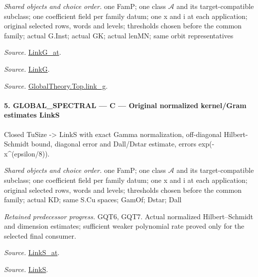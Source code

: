 \documentclass[11pt,a4paper]{article}
\numberwithin{equation}{section}
\theoremstyle{remark}\newtheorem{remark}[theorem]{Remark}
\begin{document}
\emph{Shared objects and choice order.} one FamP; one class $\mathcal A$ and its target-compatible subclass; one coefficient field per family datum; one x and i at each application; original selected rows, words and levels; thresholds chosen before the common family; actual G.Inst; actual GK; actual lenMN; same orbit representatives

\emph{Source.} \href{https://github.com/CocoSgt/riemann-hypothesis-lean/blob/7cbf7a0c32fca1badf05931879a37c3f8a2b03b4/src/Formalism/SharpRestriction/GlobalTheoremInputs.lean#L122-L137}{LinkG\_\allowbreak at}.

\emph{Source.} \href{https://github.com/CocoSgt/riemann-hypothesis-lean/blob/7cbf7a0c32fca1badf05931879a37c3f8a2b03b4/src/Formalism/SharpRestriction/GlobalTheoremInputs.lean#L138-L141}{LinkG}.

\emph{Source.} \href{https://github.com/CocoSgt/riemann-hypothesis-lean/blob/7cbf7a0c32fca1badf05931879a37c3f8a2b03b4/src/Development/AbelianVarietyTheory/Proofs/GlobalInterpolation/LinkG.lean#L14-L27}{GlobalTheory.Top.link\_\allowbreak g}.



\paragraph{5. GLOBAL\_\allowbreak SPECTRAL — C — Original normalized kernel/Gram estimates LinkS}

Closed TuSize -> LinkS with exact Gamma normalization, off-diagonal Hilbert-Schmidt bound, diagonal error and Dall/Dstar estimate, errors exp(-x\textasciicircum{}(epsilon/8)).

\emph{Shared objects and choice order.} one FamP; one class $\mathcal A$ and its target-compatible subclass; one coefficient field per family datum; one x and i at each application; original selected rows, words and levels; thresholds chosen before the common family; actual KD; same S.Cu spaces; GamOf; Dstar; Dall

\emph{Retained predecessor progress.} GQT6, GQT7. Actual normalized Hilbert–Schmidt and dimension estimates; sufficient weaker polynomial rate proved only for the selected final consumer.

\emph{Source.} \href{https://github.com/CocoSgt/riemann-hypothesis-lean/blob/7cbf7a0c32fca1badf05931879a37c3f8a2b03b4/src/Formalism/SharpRestriction/GlobalTheoremInputs.lean#L145-L149}{LinkS\_\allowbreak at}.

\emph{Source.} \href{https://github.com/CocoSgt/riemann-hypothesis-lean/blob/7cbf7a0c32fca1badf05931879a37c3f8a2b03b4/src/Formalism/SharpRestriction/GlobalTheoremInputs.lean#L152-L157}{LinkS}.
\end{document}
